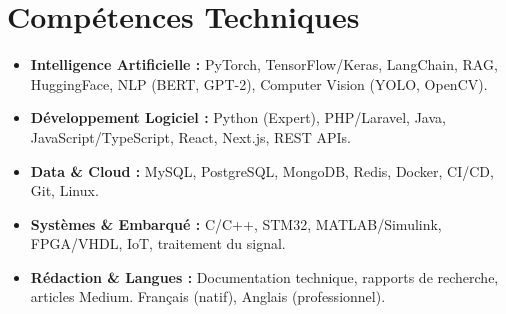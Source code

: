 \documentclass[a4paper,11pt]{article}
\begin{document}
\section{Compétences Techniques}
\begin{itemize}[leftmargin=*, nosep]
    \item \small{\textbf{Intelligence Artificielle :} PyTorch, TensorFlow/Keras, LangChain, RAG, HuggingFace, NLP (BERT, GPT-2), Computer Vision (YOLO, OpenCV).}
    \item \small{\textbf{Développement Logiciel :} Python (Expert), PHP/Laravel, Java, JavaScript/TypeScript, React, Next.js, REST APIs.}
    \item \small{\textbf{Data \& Cloud :} MySQL, PostgreSQL, MongoDB, Redis, Docker, CI/CD, Git, Linux.}
    \item \small{\textbf{Systèmes \& Embarqué :} C/C++, STM32, MATLAB/Simulink, FPGA/VHDL, IoT, traitement du signal.}
    \item \small{\textbf{Rédaction \& Langues :} Documentation technique, rapports de recherche, articles Medium. Français (natif), Anglais (professionnel).}
\end{itemize}

\end{document}
